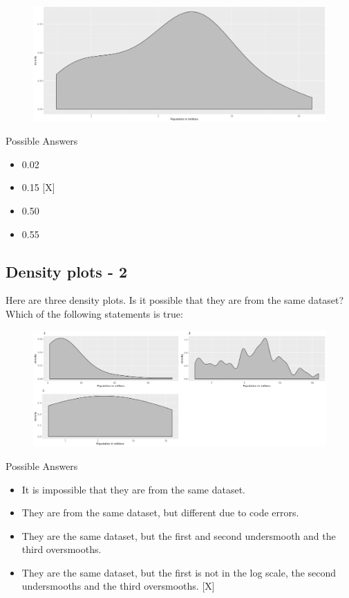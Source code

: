 \documentclass[]{article}
\providecommand{\tightlist}{%
  \setlength{\itemsep}{0pt}\setlength{\parskip}{0pt}}
\begin{document}
\begin{figure}
\centering
\includegraphics{img5.png}
\caption{}
\end{figure}

Possible Answers

\begin{itemize}
\tightlist
\item
  0.02
\item
  0.15 {[}X{]}
\item
  0.50
\item
  0.55
\end{itemize}

\subsection{\texorpdfstring{\textbf{Density plots -
2}}{Density plots - 2}}\label{density-plots---2}

Here are three density plots. Is it possible that they are from the same
dataset? Which of the following statements is true:

\begin{figure}
\centering
\includegraphics{img6.png}
\caption{}
\end{figure}

Possible Answers

\begin{itemize}
\tightlist
\item
  It is impossible that they are from the same dataset.
\item
  They are from the same dataset, but different due to code errors.
\item
  They are the same dataset, but the first and second undersmooth and
  the third oversmooths.
\item
  They are the same dataset, but the first is not in the log scale, the
  second undersmooths and the third oversmooths. {[}X{]}
\end{itemize}
\end{document}
